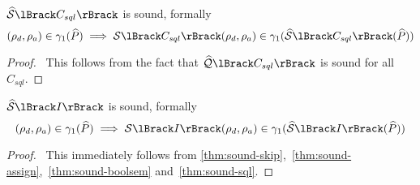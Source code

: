 \begin{conjecture}
    \label{thm:sound-sql}
    $\abssem{C_{sql}}$ is sound, formally
    \begin{equation*}
    (\rho_d, \rho_a)
        \in \concrete_1(\ab{P}) \implies \sem{C_{sql}}(\rho_d, \rho_a) \in \concrete_1(\abssem{C_{sql}}(\ab{P}))
    \end{equation*}
\end{conjecture}


\begin{proof}
    \pf\
    This follows from the fact that $\abssqlsem{C_{sql}}$ is sound for all $C_{sql}$.
\end{proof}


\begin{conjecture}
    $\abssem{I}$ is sound, formally
    \begin{equation*}
        (\rho_d, \rho_a)
            \in \concrete_1(\ab{P}) \implies \sem{I}(\rho_d, \rho_a) \in \concrete_1(\abssem{I}(\ab{P}))
    \end{equation*}
\end{conjecture}


\begin{proof}
    \pf\
    This immediately follows from \autoref{thm:sound-skip},~\ref{thm:sound-assign},~\ref{thm:sound-boolsem} and~\ref{thm:sound-sql}.
\end{proof}
